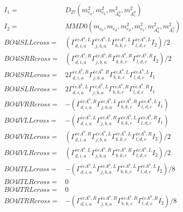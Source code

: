 \documentclass[A4,landscape]{article}
\begin{document}
\begin{align} 
I_1 = & D_{27}(m^2_{e_{{d}}}, m^2_{e_{{b}}}, m^2_{A^0_{{a}}}, m^2_{A^0_{{c}}}) \\ 
I_2 = & MMD0(m_{e_{{b}}}, m_{e_{{d}}}, m^2_{e_{{d}}}, m^2_{e_{{b}}}, m^2_{A^0_{{a}}}, m^2_{A^0_{{c}}}) \\ 
  BO4lSLLcross= & ( \Gamma^{\bar{e}e A^0 ,L}_{d, i, a} \Gamma^{\bar{e}e A^0 ,L}_{j, b, a} \Gamma^{\bar{e}e A^0 ,L}_{b, k, c} \Gamma^{\bar{e}e A^0 ,L}_{l, d, c} I_2)/2 \\ 
  BO4lSRRcross= & ( \Gamma^{\bar{e}e A^0 ,R}_{d, i, a} \Gamma^{\bar{e}e A^0 ,R}_{j, b, a} \Gamma^{\bar{e}e A^0 ,R}_{b, k, c} \Gamma^{\bar{e}e A^0 ,R}_{l, d, c} I_2)/2 \\ 
  BO4lSRLcross= & 2  \Gamma^{\bar{e}e A^0 ,R}_{d, i, a} \Gamma^{\bar{e}e A^0 ,R}_{j, b, a} \Gamma^{\bar{e}e A^0 ,L}_{b, k, c} \Gamma^{\bar{e}e A^0 ,L}_{l, d, c} I_1 \\ 
  BO4lSLRcross= & 2  \Gamma^{\bar{e}e A^0 ,L}_{d, i, a} \Gamma^{\bar{e}e A^0 ,L}_{j, b, a} \Gamma^{\bar{e}e A^0 ,R}_{b, k, c} \Gamma^{\bar{e}e A^0 ,R}_{l, d, c} I_1 \\ 
  BO4lVRRcross= & -( \Gamma^{\bar{e}e A^0 ,R}_{d, i, a} \Gamma^{\bar{e}e A^0 ,L}_{j, b, a} \Gamma^{\bar{e}e A^0 ,R}_{b, k, c} \Gamma^{\bar{e}e A^0 ,L}_{l, d, c} I_1) \\ 
  BO4lVLLcross= & -( \Gamma^{\bar{e}e A^0 ,L}_{d, i, a} \Gamma^{\bar{e}e A^0 ,R}_{j, b, a} \Gamma^{\bar{e}e A^0 ,L}_{b, k, c} \Gamma^{\bar{e}e A^0 ,R}_{l, d, c} I_1) \\ 
  BO4lVRLcross= & ( \Gamma^{\bar{e}e A^0 ,R}_{d, i, a} \Gamma^{\bar{e}e A^0 ,L}_{j, b, a} \Gamma^{\bar{e}e A^0 ,L}_{b, k, c} \Gamma^{\bar{e}e A^0 ,R}_{l, d, c} I_2)/2 \\ 
  BO4lVLRcross= & ( \Gamma^{\bar{e}e A^0 ,L}_{d, i, a} \Gamma^{\bar{e}e A^0 ,R}_{j, b, a} \Gamma^{\bar{e}e A^0 ,R}_{b, k, c} \Gamma^{\bar{e}e A^0 ,L}_{l, d, c} I_2)/2 \\ 
  BO4lTLLcross= & -( \Gamma^{\bar{e}e A^0 ,L}_{d, i, a} \Gamma^{\bar{e}e A^0 ,L}_{j, b, a} \Gamma^{\bar{e}e A^0 ,L}_{b, k, c} \Gamma^{\bar{e}e A^0 ,L}_{l, d, c} I_2)/8 \\ 
  BO4lTLRcross= & 0 \\ 
  BO4lTRLcross= & 0 \\ 
  BO4lTRRcross= & -( \Gamma^{\bar{e}e A^0 ,R}_{d, i, a} \Gamma^{\bar{e}e A^0 ,R}_{j, b, a} \Gamma^{\bar{e}e A^0 ,R}_{b, k, c} \Gamma^{\bar{e}e A^0 ,R}_{l, d, c} I_2)/8 \\ 
\end{align} 
\end{document}
